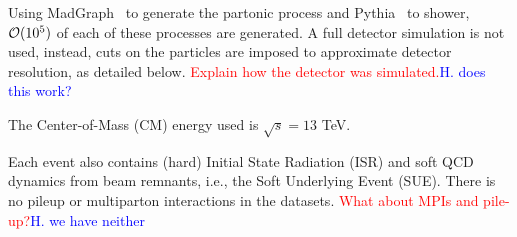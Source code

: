    Using MadGraph~\cite{alwall_madgraph2011} to generate the partonic process and Pythia~\cite{sjostrand_pythia2015} to shower, ${\cal O}(10^5)$ of each of these processes are generated.
    A full detector simulation is not used, instead, cuts on the particles are imposed to approximate detector resolution, as detailed below. 
    {\textcolor{red}{Explain how the detector was simulated.}\textcolor{blue}{H. does this work?}}
    
    The Center-of-Mass (CM) energy used is \(\sqrt{s}=13 \) TeV.

    Each event also contains (hard) Initial State Radiation (ISR) and soft QCD dynamics from beam remnants, i.e., the Soft Underlying Event (SUE).
    There is no pileup or multiparton interactions in the datasets.
    {\textcolor{red}{What about MPIs and pile-up?}\textcolor{blue}{H. we have neither}}


